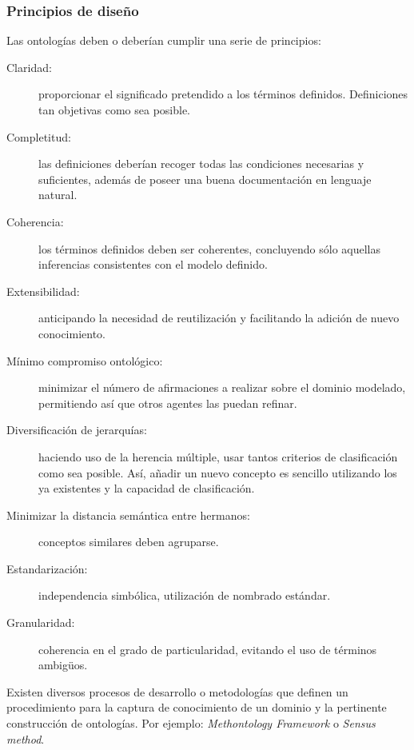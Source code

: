 \subsubsection{Principios de diseño}\label{onto-design}
Las ontologías deben o deberían cumplir una serie de principios:
\begin{description}
\item[Claridad:] proporcionar el significado pretendido a los términos
definidos. Definiciones tan objetivas como sea posible.
\item[Completitud:] las definiciones deberían recoger todas las condiciones
necesarias y suficientes, además de poseer una buena documentación en lenguaje natural.
 \item[Coherencia:] los términos definidos deben ser coherentes, concluyendo
 sólo aquellas inferencias consistentes con el modelo definido.
 \item[Extensibilidad:] anticipando la necesidad de reutilización y facilitando
 la adición de nuevo conocimiento.
 \item[Mínimo compromiso ontológico:] minimizar el número de afirmaciones a
 realizar sobre el dominio modelado, permitiendo así que otros agentes las
 puedan refinar.

\item[Diversificación de jerarquías:] haciendo uso de la herencia múltiple, usar
tantos criterios de clasificación como sea posible. Así, añadir un nuevo concepto
es sencillo utilizando los ya existentes y la capacidad de clasificación.

\item[Minimizar la distancia semántica entre hermanos:] conceptos similares
deben agruparse.
 
  \item[Estandarización:] independencia simbólica, utilización de nombrado estándar.
 \item[Granularidad:] coherencia en el grado de particularidad, evitando el uso
 de términos ambig\"{u}os.
\end{description}

\begin{note}
Existen diversos procesos de desarrollo o metodologías que definen un
procedimiento para la captura de conocimiento de un dominio y la pertinente
construcción de ontologías. Por ejemplo: \textit{Methontology Framework} o \textit{Sensus
method}. 

\end{note}



